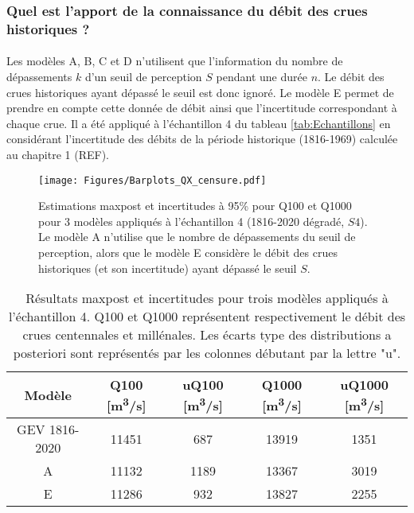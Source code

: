 \documentclass[11pt]{article}
\begin{document}
\FloatBarrier

	\subsubsection{Quel est l'apport de la connaissance du débit des crues historiques ?}

	\paragraph{} Les modèles A, B, C et D n'utilisent que l'information du nombre de dépassements $k$ d'un seuil de perception $S$ pendant une durée $n$. Le débit des crues historiques ayant dépassé le seuil est donc ignoré. Le modèle E permet de prendre en compte cette donnée de débit ainsi que l'incertitude correspondant à chaque crue. Il a été appliqué à l'échantillon 4 du tableau \ref{tab:Echantillons} en considérant l'incertitude des débits de la période historique (1816-1969) calculée au chapitre 1 (REF).
	
	
	\begin{figure}[h]
		\centering
		\texttt{[image: Figures/Barplots\_QX\_censure.pdf]}
		\caption{Estimations maxpost et incertitudes à 95\% pour Q100 et Q1000 pour 3 modèles appliqués à l'échantillon 4 (1816-2020 dégradé, $S4$). Le modèle A n'utilise que le nombre de dépassements du seuil de perception, alors que le modèle E considère le débit des crues historiques (et son incertitude) ayant dépassé le seuil $S$.}
		\label{fig:CensureArtif}
	\end{figure}
	
	\begin{table}[h]
		\centering
		\caption{Résultats maxpost et incertitudes pour trois modèles appliqués à l'échantillon 4. Q100 et Q1000 représentent respectivement le débit des crues centennales et millénales. Les écarts type des distributions a posteriori sont représentés par les colonnes débutant par la lettre "u". }
		\label{tab:ResCensure}
		\begin{tabular}{|c|c|c|c|c|}
			\hline
			Modèle        & Q100 [m\textsuperscript{3}/s] & uQ100 [m\textsuperscript{3}/s] & Q1000 [m\textsuperscript{3}/s] & uQ1000 [m\textsuperscript{3}/s] \\ \hline
			GEV 1816-2020 & 11451 & 687   & 13919 & 1351   \\ \hline
			A             & 11132 & 1189  & 13367 & 3019   \\ \hline
			E       & 11286 & 932   & 13827 & 2255   \\ \hline
		\end{tabular}%
		
	\end{table}
	
\end{document}
